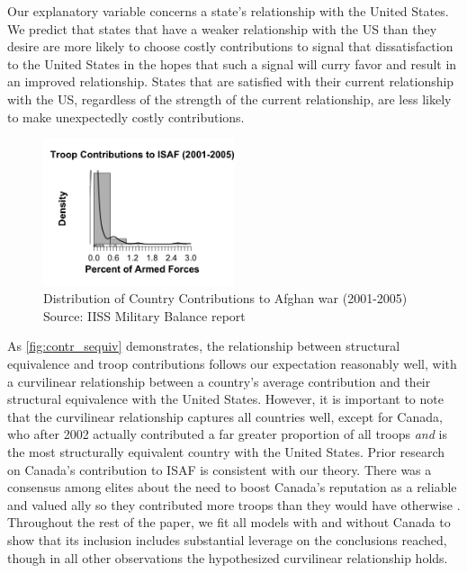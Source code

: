 \documentclass[12pt,letterpaper]{article}
\begin{document}
		Our explanatory variable concerns a state's relationship with the United States. We predict that states that have a weaker relationship with the US than they desire are more likely to choose costly contributions to signal that dissatisfaction to the United States in the hopes that such a signal will curry favor and result in an improved relationship. States that are satisfied with their current relationship with the US, regardless of the strength of the current relationship, are less likely to make unexpectedly costly contributions.

		\begin{figure}[ht]
			\centering
			\includegraphics[width=0.5\textwidth]{figures/troops_hist_largebin.png}
			\caption{Distribution of Country Contributions to Afghan war (2001-2005) Source: IISS Military Balance report}
			\label{fig:troop_hist}
		\end{figure}

		As \ref{fig:contr_sequiv} demonstrates, the relationship between structural equivalence and troop contributions follows our expectation reasonably well, with a curvilinear relationship between a country's average contribution and their structural equivalence with the United States. However, it is important to note that the curvilinear relationship captures all countries well, except for Canada, who after 2002 actually contributed a far greater proportion of all troops \textit{and} is the most structurally equivalent country with the United States. Prior research on Canada's contribution to ISAF is consistent with our theory. There was a consensus among elites about the need to boost Canada's reputation as a reliable and valued ally so they contributed more troops than they would have otherwise \citep{massie_alliancevaluestatus_2018}. Throughout the rest of the paper, we fit all models with and without Canada to show that its inclusion includes substantial leverage on the conclusions reached, though in all other observations the hypothesized curvilinear relationship holds. 
\end{document}
